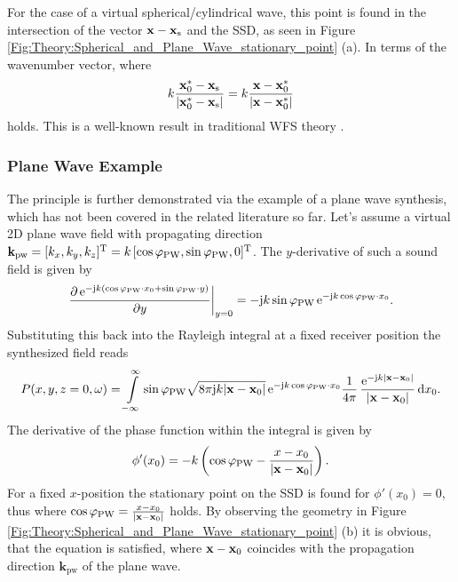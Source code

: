 For the case of a virtual spherical/cylindrical wave, this point is found in the intersection of the vector $ \mathbf{x} - \mathbf{x}_{\mathrm{s}} $ and the SSD, as seen in Figure \ref{Fig:Theory:Spherical_and_Plane_Wave_stationary_point} (a). In terms of the wavenumber vector, where
\begin{equation}
k \frac{\mathbf{x}_0^*-\mathbf{x}_{\mathrm{s}}}{|\mathbf{x}_0^*-\mathbf{x}_{\mathrm{s}}|} = k \frac{\mathbf{x}-\mathbf{x}_0^*}{|\mathbf{x}-\mathbf{x}_0^*|}
\end{equation}
holds.
This is a well-known result in traditional WFS theory \cite{Start1997:phd,Verheijen1997:phd}.
%
\subsubsection{Plane Wave Example}	
The principle is further demonstrated via the example of a plane wave synthesis, which has not been covered in the related literature so far. Let's assume a virtual 2D plane wave field with propagating direction $\mathbf{k}_\text{pw}=[k_x,k_y,k_z]^{\mathrm{T}}=k\,[\cos\varphi_\text{PW},\sin\varphi_\text{PW},0]^{\mathrm{T}}$. The $y$-derivative of such a sound field is given by
\begin{equation}
\left. \frac{\partial\,\mathrm{e}^{-\mathrm{j} k ( \cos\varphi_\text{PW}\cdot x_0 + \sin\varphi_\text{PW}\cdot y )} }{\partial y} \right|_{ y = 0 } = -\mathrm{j} k \sin\varphi_\text{PW}\,\mathrm{e}^{-\mathrm{j} k \cos\varphi_\text{PW}\cdot x_0}.
\end{equation}
Substituting this back into the Rayleigh integral at a fixed receiver position the synthesized field reads
\begin{equation}
P(x,y,z=0,\omega) = \int\limits_{-\infty}^{\infty} \sin\varphi_\text{PW} \sqrt{8\pi \mathrm{j} k |\mathbf{x}-\mathbf{x}_0|}\,
\mathrm{e}^{-\mathrm{j} k \cos\varphi_\text{PW} \cdot x_0} \frac{1}{4\pi}\,\frac{\mathrm{e}^{-\mathrm{j} k |\mathbf{x} - \mathbf{x}_0|}}{|\mathbf{x} - \mathbf{x}_0|} \, \mathrm{d} x_0.\nonumber
\end{equation}
The derivative of the phase function within the integral is given by
\begin{equation}
\label{Eq:Phix0_PlaneWaveExample}
\phi'(x_0) = - k \left( \cos\varphi_\text{PW} - \frac{x-x_0}{|\mathbf{x} - \mathbf{x}_0|} \right).
\end{equation}
For a fixed $x$-position the stationary point on the SSD is found for $\phi'(x_0) = 0$, thus where $\cos\varphi_\text{PW} = \frac{x-x_0}{|\mathbf{x}-\mathbf{x}_0|}$ holds. By observing the geometry in Figure \ref{Fig:Theory:Spherical_and_Plane_Wave_stationary_point} (b) it is obvious, that the equation is satisfied, where $\mathbf{x}-\mathbf{x}_0$ coincides with the propagation direction $\mathbf{k}_\text{pw}$ of the plane wave. 

